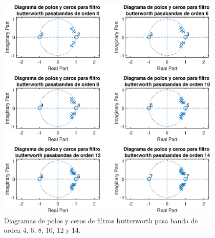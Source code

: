 \begin{enumerate}
\begin{figure}[H]
    \centering
    \includegraphics[width = .95\linewidth]{Figuras/p4_3_zp.eps}
    \caption{Diagramas de polos y ceros de filtros butterworth pasa banda de orden 4, 6, 8, 10, 12 y 14.}
    \label{fig:p4_3zp}
\end{figure}

\end{enumerate}